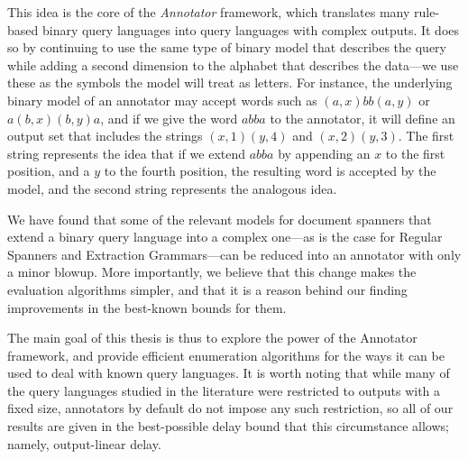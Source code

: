 This idea is the core of the {\it Annotator} framework, which translates many rule-based binary query languages into query languages with complex outputs. It does so by continuing to use the same type of binary model that describes the query while adding a second dimension to the alphabet that describes the data---we use these as the symbols the model will treat as letters. For instance, the underlying binary model of an annotator may accept words such as  $(a,x)bb(a,y)$ or $a(b,x)(b,y)a$, and if we give the word $abba$ to the annotator, it will define an output set that includes the strings $(x,1)(y,4)$ and $(x,2)(y,3)$. The first string represents the idea that if we extend $abba$ by appending an $x$ to the first position, and a $y$ to the fourth position, the resulting word is accepted by the model, and the second string  represents the analogous idea.

We have found that some of the relevant models for document spanners that extend a binary query language into a complex one---as is the case for Regular Spanners and Extraction Grammars---can be reduced into an annotator with only a minor blowup. More importantly, we believe that this change makes the evaluation algorithms simpler, and that it is a reason behind our finding improvements in the best-known bounds for them.

The main goal of this thesis is thus to explore the power of the Annotator framework, and provide efficient enumeration algorithms for the ways it can be used to deal with known query languages. It is worth noting that while many of the query languages studied in the literature were restricted to outputs with a fixed size, annotators by default do not impose any such restriction, so all of our results are given in the best-possible delay bound that this circumstance allows; namely, output-linear delay.

